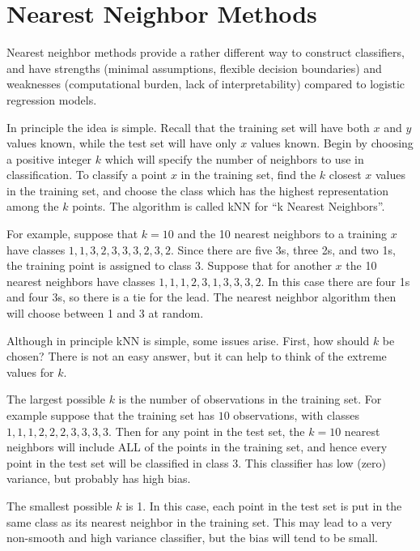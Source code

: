 \documentclass[]{krantz}
\begin{document}
\hypertarget{nearest-neighbor-methods}{%
\section{Nearest Neighbor Methods}\label{nearest-neighbor-methods}}

Nearest neighbor methods provide a rather different way to construct classifiers, and have strengths (minimal assumptions, flexible decision boundaries) and weaknesses (computational burden, lack of interpretability) compared to logistic regression models.

In principle the idea is simple. Recall that the training set will have both \(x\) and \(y\) values known, while the test set will have only \(x\) values known. Begin by choosing a positive integer \(k\) which will specify the number of neighbors to use in classification. To classify a point \(x\) in the training set, find the \(k\) closest \(x\) values in the training set, and choose the class which has the highest representation among the \(k\) points. The algorithm is called kNN for ``k Nearest Neighbors''.

For example, suppose that \(k=10\) and the 10 nearest neighbors to a training \(x\) have classes \(1, 1, 3, 2, 3, 3, 3, 2, 3, 2\). Since there are five 3s, three 2s, and two 1s, the training point is assigned to class 3. Suppose that for another \(x\) the 10 nearest neighbors have classes \(1,1,1,2,3,1,3,3,3,2\). In this case there are four 1s and four 3s, so there is a tie for the lead. The nearest neighbor algorithm then will choose between 1 and 3 at random.

Although in principle kNN is simple, some issues arise. First, how should \(k\) be chosen? There is not an easy answer, but it can help to think of the extreme values for \(k\).

The largest possible \(k\) is the number of observations in the training set. For example suppose that the training set has \(10\) observations, with classes \(1, 1, 1, 2, 2, 2, 3, 3, 3, 3\). Then for any point in the test set, the \(k=10\) nearest neighbors will include ALL of the points in the training set, and hence every point in the test set will be classified in class 3. This classifier has low (zero) variance, but probably has high bias.

The smallest possible \(k\) is 1. In this case, each point in the test set is put in the same class as its nearest neighbor in the training set. This may lead to a very non-smooth and high variance classifier, but the bias will tend to be small.
\end{document}
